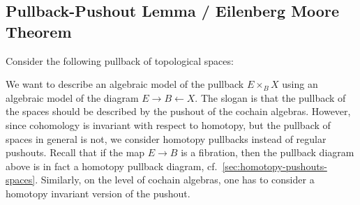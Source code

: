 \documentclass{scrartcl}
\theoremstyle{plain}
\theoremstyle{definition}
\renewcommand{\epsilon}{\varepsilon}
\newcommand{\from}{\leftarrow}
\DeclareMathOperator{\Sh}{Sh}
\DeclareMathOperator{\sgn}{sgn}
\begin{document}


\subsection{Pullback-Pushout Lemma / Eilenberg Moore Theorem}\label{subsec:eilenberg_moore}
Consider the following pullback of topological spaces:
\begin{center}\label{diag:pullback-eilenberg-moore}
\end{center}

We want to describe an algebraic model of the pullback $E\times_B X$ using an algebraic model of the diagram $E\to B\from X$. The slogan is that the pullback of the spaces should be described by the pushout of the cochain algebras. However, since cohomology is invariant with respect to homotopy, but the pullback of spaces in general is not, we consider homotopy pullbacks instead of regular pushouts. Recall that if the map $E\to B$ is a fibration, then the pullback diagram above is in fact a homotopy pullback diagram, cf.~\cref{sec:homotopy-pushouts-spaces}. Similarly, on the level of cochain algebras, one has to consider a homotopy invariant version of the pushout. 
\end{document}
